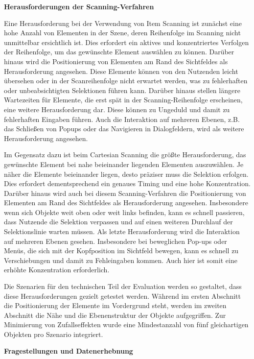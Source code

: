 \textbf{Herausforderungen der Scanning-Verfahren}

Eine Herausforderung bei der Verwendung von Item Scanning ist zunächst eine hohe Anzahl von Elementen in der Szene, deren Reihenfolge im Scanning nicht unmittelbar ersichtlich ist. Dies erfordert ein aktives und konzentriertes Verfolgen der Reihenfolge, um das gewünschte Element auswählen zu können. Darüber hinaus wird die Positionierung von Elementen am Rand des Sichtfeldes als Herausforderung angesehen. Diese Elemente können von den Nutzenden leicht übersehen oder in der Scanreihenfolge nicht erwartet werden, was zu fehlerhaften oder unbeabsichtigten Selektionen führen kann. Darüber hinaus stellen längere Wartezeiten für Elemente, die erst spät in der Scanning-Reihenfolge erscheinen, eine weitere Herausforderung dar. Diese können zu Ungeduld und damit zu fehlerhaften Eingaben führen. Auch die Interaktion auf mehreren Ebenen, z.B. das Schließen von Popups oder das Navigieren in Dialogfeldern, wird als weitere Herausforderung angesehen.

Im Gegensatz dazu ist beim Cartesian Scanning die größte Herausforderung, das gewünschte Element bei nahe beieinander liegenden Elementen auszuwählen. Je näher die Elemente beieinander liegen, desto präziser muss die Selektion erfolgen. Dies erfordert dementsprechend ein genaues Timing und eine hohe Konzentration. Darüber hinaus wird auch bei diesem Scanning-Verfahren die Positionierung von Elementen am Rand des Sichtfeldes als Herausforderung angesehen. Insbesondere wenn sich Objekte weit oben oder weit links befinden, kann es schnell passieren, dass Nutzende die Selektion verpassen und auf einen weiteren Durchlauf der Selektionslinie warten müssen. Als letzte Herausforderung wird die Interaktion auf mehreren Ebenen gesehen. Insbesondere bei beweglichen Pop-ups oder Menüs, die sich mit der Kopfposition im Sichtfeld bewegen, kann es schnell zu Verschiebungen und damit zu Fehleingaben kommen. Auch hier ist somit eine erhöhte Konzentration erforderlich. 

Die Szenarien für den technischen Teil der Evaluation werden so gestaltet, dass diese Herausforderungen gezielt getestet werden. Während im ersten Abschnitt die Positionierung der Elemente im Vordergrund steht, werden im zweiten Abschnitt die Nähe und die Ebenenstruktur der Objekte aufgegriffen. Zur Minimierung von Zufallseffekten wurde eine Mindestanzahl von fünf gleichartigen Objekten pro Szenario integriert.

\textbf{Fragestellungen und Datenerhebnung}


